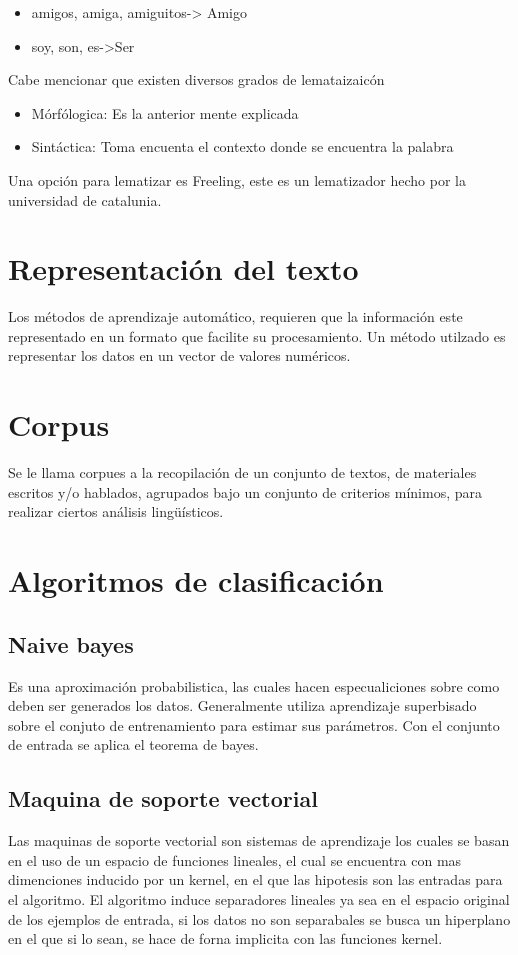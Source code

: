 	\begin{itemize}
		\item amigos, amiga, amiguitos-> Amigo
		\item soy, son, es->Ser
	\end{itemize}

Cabe mencionar que existen diversos grados de lemataizaicón

	\begin{itemize}
		\item Mórfólogica: Es la anterior mente explicada
		\item Sintáctica: Toma encuenta el contexto donde se encuentra la palabra

	\end{itemize}

Una opción para lematizar es Freeling, este es un lematizador hecho por la
universidad de catalunia.

\section{Representación del texto}
Los métodos de aprendizaje automático, requieren que la información este
representado en un formato que facilite su procesamiento. Un método utilzado
es representar los datos en un vector de valores numéricos.

\section{Corpus}
Se le llama corpues a la recopilación de un conjunto de textos, de materiales escritos y/o hablados, agrupados bajo un conjunto de criterios mínimos, para realizar ciertos análisis lingüísticos.


\section{Algoritmos de clasificación}


\subsection{Naive bayes}
Es una aproximación probabilistica, las cuales hacen especualiciones sobre
como deben ser generados los datos. Generalmente utiliza aprendizaje superbisado sobre el conjuto de entrenamiento para estimar sus parámetros. Con el conjunto de entrada se aplica el teorema de bayes.

\subsection{Maquina de soporte vectorial}
Las maquinas de soporte vectorial son sistemas de aprendizaje los cuales
se basan en el uso de un espacio de funciones lineales, el cual se encuentra con
mas dimenciones inducido por un kernel, en el que las hipotesis son las entradas
para el algoritmo.
El algoritmo induce separadores lineales ya sea en el espacio original de los
ejemplos de entrada, si los datos no son separabales se busca un hiperplano en
el que si lo sean, se hace de forna implicita con las funciones kernel.